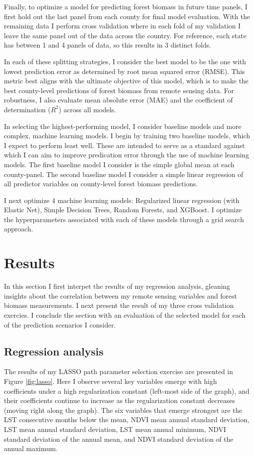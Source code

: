 \documentclass{article}
\begin{document}
Finally, to optimize a model for predicting forest biomass in future time panels, I first hold out the last panel from each county for final model evaluation. With the remaining data I perform cross validation where in each fold of my validation I leave the same panel out of the data across the country. For reference, each state has between 1 and 4 panels of data, so this results in 3 distinct folds. 

In each of these splitting strategies, I consider the best model to be the one with lowest prediction error as determined by root mean squared error (RMSE). This metric best aligns with the ultimate objective of this model, which is to make the best county-level predictions of forest biomass from remote sensing data. For robustness, I also evaluate mean absolute error (MAE) and the coefficient of determination ($R^2$) across all models.

In selecting the highest-performing model, I consider baseline models and more complex, machine learning models. I begin by training two baseline models, which I expect to perform least well. These are intended to  serve as a standard against which I can aim to improve predication error through the use of machine learning models. The first baseline model I consider is the simple global mean at each county-panel. The second baseline model I consider a simple linear regression of all predictor variables on county-level forest biomass predictions.

I next optimize 4 machine learning models: Regularized linear regression (with Elastic Net), Simple Decision Trees, Random Forests, and XGBoost. I optimize the hyperparameters associated with each of these models through a grid search approach.

\section{Results}
\label{sec:results}
In this section I first interpet the results of my regression analysis, gleaning insights about the correlation between my remote sensing variables and forest biomass measurements. I next present the result of my three cross validation exercies. I conclude the section with an evaluation of the selected model for each of the prediction scenarios I consider. 

\subsection{Regression analysis}
The results of my LASSO path parameter selection exercise are presented in Figure \ref{fig:lasso}. Here I observe several key variables emerge with high coefficients under a high regularization constant (left-most side of the graph), and their coefficients continue to increase as the regularization constant decreases (moving right along the graph). The six variables that emerge strongest are the LST consecutive months below the mean, NDVI mean annual standard deviation, LST mean annual standard deviation, LST mean annual minimum, NDVI standard deviation of the annual mean, and NDVI standard deviation of the annual maximum. 
\end{document}
